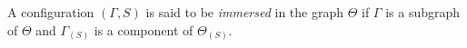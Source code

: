 A configuration $(\Gamma, S)$ is said to be \textit{immersed} in the graph $\Theta$ if $\Gamma$ is a subgraph of $\Theta$ and $\Gamma_{(S)}$ is a component of $\Theta_{(S)}$.
